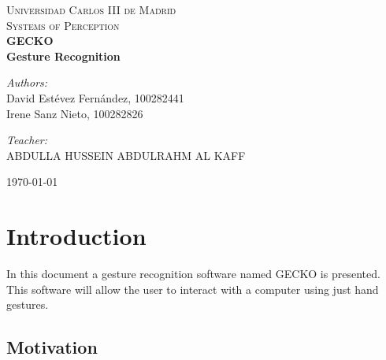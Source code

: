 \documentclass{article}
\begin{document}
\begin{titlepage}

\begin{center}
\textsc{\LARGE Universidad Carlos III de Madrid}\\[0.5cm]
\textsc{\Large Systems of Perception}\\[4cm]


{\Huge \bfseries{GECKO\\[1cm] Gesture Recognition}\\[8cm]}


\begin{minipage}{0.55\textwidth}
\begin{flushleft} \large
\emph{Authors:}\\
David Estévez Fernández, 100282441\\
Irene Sanz Nieto, 100282826\\
\end{flushleft}
\end{minipage}
\begin{minipage}{0.4\textwidth}
\begin{flushright} \large
\emph{Teacher:}\\
ABDULLA HUSSEIN ABDULRAHM AL KAFF
\end{flushright}\end{minipage}\vfill

{\large \today}

\end{center}
\end{titlepage}

%
\newpage
%
\tableofcontents
\newpage

\section{Introduction}
In this document a gesture recognition software named GECKO is presented. This software will allow the user to interact with a computer using just hand gestures. 

\subsection{Motivation}
\end{document}

